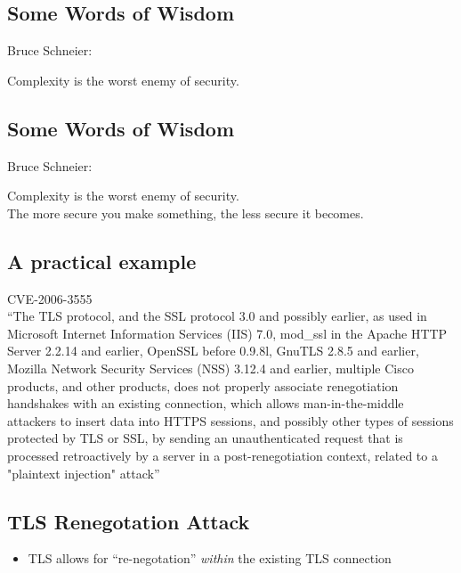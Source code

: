 \documentclass[xga]{xdvislides}
\begin{document}
\subsection{Some Words of Wisdom}
Bruce Schneier:
\\

\Huge
\begin{center}
Complexity is the worst enemy of security.
\end{center}
\Normalsize

\subsection{Some Words of Wisdom}
Bruce Schneier:
\\

\Huge
\begin{center}
Complexity is the worst enemy of security.
\\
\addvspace{.5in}
The more secure you make something, the less secure it becomes.
\end{center}
\Normalsize

\subsection{A practical example}
CVE-2006-3555
\\

``The TLS protocol, and the SSL protocol 3.0 and possibly earlier, as used in
Microsoft Internet Information Services (IIS) 7.0, mod\_ssl in the Apache HTTP
Server 2.2.14 and earlier, OpenSSL before 0.9.8l, GnuTLS 2.8.5 and earlier,
Mozilla Network Security Services (NSS) 3.12.4 and earlier, multiple Cisco
products, and other products, does not properly associate renegotiation
handshakes with an existing connection, which allows man-in-the-middle
attackers to insert data into HTTPS sessions, and possibly other types of
sessions protected by TLS or SSL, by sending an unauthenticated request that
is processed retroactively by a server in a post-renegotiation context,
related to a "plaintext injection" attack''
\vspace*{\fill}

\subsection{TLS Renegotation Attack}
\begin{itemize}
	\item TLS allows for ``re-negotation'' {\em within} the existing TLS
		connection
\end{itemize}
\end{document}
